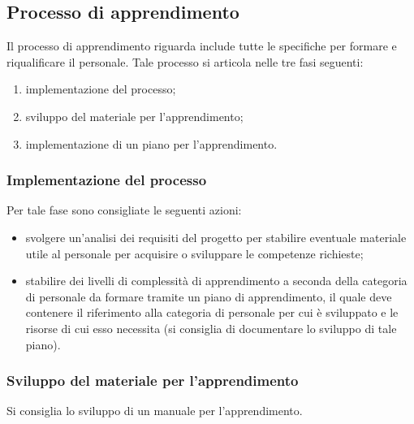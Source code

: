 \subsection{Processo di apprendimento}
Il processo di apprendimento riguarda include tutte le specifiche per formare e riqualificare il personale. Tale processo si articola nelle tre fasi seguenti:

\begin{enumerate}
    \item implementazione del processo;
    \item sviluppo del materiale per l'apprendimento;
    \item implementazione di un piano per l'apprendimento.
\end{enumerate}

\subsubsection{Implementazione del processo}Per tale fase sono consigliate le seguenti azioni:
\begin{itemize}
    \item svolgere un'analisi dei requisiti del progetto per stabilire eventuale materiale utile al personale per acquisire o sviluppare le competenze richieste;
    \item stabilire dei livelli di complessità di apprendimento a seconda della categoria di personale da  formare tramite un piano di apprendimento, il quale deve contenere il riferimento alla categoria di personale per cui è sviluppato e le risorse di cui esso necessita (si consiglia di documentare lo sviluppo di tale piano).
\end{itemize}


\subsubsection{Sviluppo del materiale per l'apprendimento}
Si consiglia lo sviluppo di un manuale per l'apprendimento.

